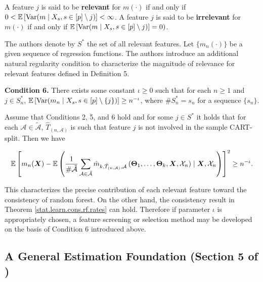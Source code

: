 \begin{definition}

A feature \(j\) is said to be \textbf{relevant} for \(m(\cdot)\) if and only if \(0 < \mathbb{E} \left[\mathrm{Var}(m \mid X_s, s \in [p]\setminus j ) \right] < \infty\). A feature \(j\) is said to be \textbf{irrelevant} for \(m(\cdot)\) if and only if \(\mathbb{E} \left[\mathrm{Var}(m \mid X_s, s \in [p]\setminus j ) \right] = 0)\).

\end{definition}

The authors denote by \(S^*\) the set of all relevant features. Let \(\{m_n(\cdot)\}\) be a given sequence of regression functions. The authors introduce an additional natural regularity condition to characterize the magnitude of relevance for relevant features defined in Definition 5.

\textbf{Condition 6.} There exists some constant \(\iota \geq 0\) such that for each \(n \geq 1\) and \(j \in S_n^*\), \(\mathbb{E} \left[ \mathrm{Var}(m_n \mid X_s, s \in [p] \setminus \{j\} )\right] \geq n^{-\iota}\), where \(\# S_n^* = s_n\) for a sequence \(\{s_n\}\).

\begin{theorem}

Assume that Conditions 2, 5, and 6 hold and for some \(j \in S^*\) it holds that for each \(\mathcal{A} \in \tilde{\mathcal{A}}\), \(\hat{T}_{(n, \mathcal{A})}\) is such that feature \(j\) is not involved in the sample CART-split. Then we have

\[
\mathbb{E} \left[ m_n(\boldsymbol{X}) - \mathbb{E} \left( \frac{1}{\# \tilde{\mathcal{A}}} \sum_{\mathcal{A} \in \tilde{\mathcal{A}}} \hat{m}_{k, \hat{T}_{(n, \mathcal{A})}, \mathcal{A}}\left(\boldsymbol{\Theta}_1, \ldots, \boldsymbol{\Theta}_k, \boldsymbol{X}, \mathcal{X}_n\right) \mid \boldsymbol{X}, \mathcal{X}_n  \right) \right]^2 \geq n^{-\iota}.
\]

\end{theorem}

This characterizes the precise contribution of each relevant feature toward the consistency of random forest. On the other hand, the consistency result in Theorem \ref{stat.learn.cons.rf.rates} can hold. Therefore if parameter \(\iota\) is appropriately chosen, a feature screening or selection method may be developed on the basis of Condition 6 introduced above.

\subsection{A General Estimation Foundation (Section 5 of \citet{Chi2020})}

